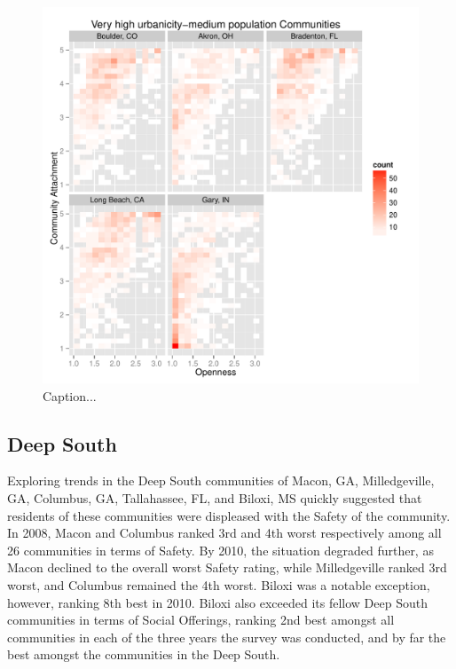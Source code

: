 \documentclass[11pt]{article}\usepackage{knitr}
\begin{document}
\begin{knitrout}
\color{fgcolor}\begin{figure}[H]

\includegraphics[width=\maxwidth]{figure/west_one} \caption[Caption]{Caption...\label{fig:west_one}}
\end{figure}


\end{knitrout}


\subsection*{Deep South}
Exploring trends in the Deep South communities of Macon, GA, Milledgeville, GA, Columbus, GA, Tallahassee, FL, and Biloxi, MS quickly suggested that residents of these communities were displeased with the Safety of the community. In 2008, Macon and Columbus ranked 3rd and 4th worst respectively among all 26 communities in terms of Safety. By 2010, the situation degraded further, as Macon declined to the overall worst Safety rating, while Milledgeville ranked 3rd worst, and Columbus remained the 4th worst. Biloxi was a notable exception, however, ranking 8th best in 2010. Biloxi also exceeded its fellow Deep South communities in terms of Social Offerings, ranking 2nd best amongst all communities in each of the three years the survey was conducted, and by far the best amongst the communities in the Deep South.
\end{document}

